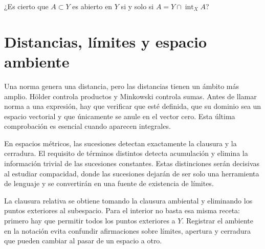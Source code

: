 \begin{ejercicio}\label{ej:lectura-4-6}
¿Es cierto que $A\subset Y$ es abierto en $Y$ si y solo si $A=Y\cap\operatorname{int}_X A$?
\end{ejercicio}


\section{Distancias, límites y espacio ambiente}
Una norma genera una distancia, pero las distancias tienen un ámbito más amplio. Hölder controla productos y Minkowski controla sumas. Antes de llamar norma a una expresión, hay que verificar que esté definida, que su dominio sea un espacio vectorial y que únicamente se anule en el vector cero. Esta última comprobación es esencial cuando aparecen integrales.

En espacios métricos, las sucesiones detectan exactamente la clausura y la cerradura. El requisito de términos distintos detecta acumulación y elimina la información trivial de las sucesiones constantes. Estas distinciones serán decisivas al estudiar compacidad, donde las sucesiones dejarán de ser solo una herramienta de lenguaje y se convertirán en una fuente de existencia de límites.

La clausura relativa se obtiene tomando la clausura ambiental y eliminando los puntos exteriores al subespacio. Para el interior no basta esa misma receta: primero hay que permitir todos los puntos exteriores a $Y$. Registrar el ambiente en la notación evita confundir afirmaciones sobre límites, apertura y cerradura que pueden cambiar al pasar de un espacio a otro.
